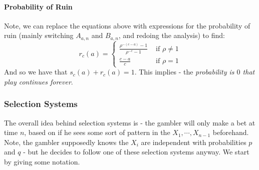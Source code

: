 \documentclass[12pt,a4paper]{article}
\newcommand{\1}[1]{\mathbbm{1}\left\{ #1 \right\}}
\begin{document}
\paragraph{Probability of Ruin} Note, we can replace the equations above with expressions for the probability of ruin (mainly switching $A_{a,n}$ and $B_{a,n}$, and redoing the analysis) to find:
$$
	r_c(a) = \begin{cases}
	\frac{\rho^{-(c-a)} - 1}{\rho^{-c} - 1} & \text{ if $\rho \neq 1$}\\
	\frac{c - a}{c} & \text{ if $\rho = 1$}
	\end{cases}
$$
And so we have that $s_c(a) + r_c(a) = 1$. This implies - the \textit{probability is $0$ that play continues forever}.

\subsubsection{Selection Systems}
The overall idea behind selection systems is - the gambler will only make a bet at time $n$, based on if he sees some sort of pattern in the $X_1, \cdots, X_{n-1}$ beforehand. Note, the gambler supposedly knows the $X_i$ are independent with probabilities $p$ and $q$ - but he decides to follow one of these selection systems anyway. We start by giving some notation.
\end{document}
